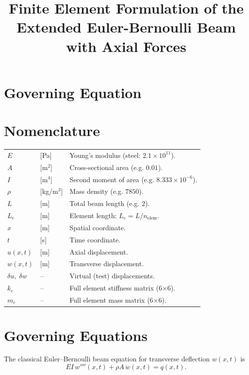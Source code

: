 \documentclass{article}
\begin{document}
	
	\title{Finite Element Formulation of the Extended Euler-Bernoulli Beam with Axial Forces}
	\author{}
	\date{}
	\maketitle
	
	\section*{Governing Equation}
	\section*{Nomenclature}
	\begin{tabular}{p{2cm} p{1cm} p{11cm}}
		$E$           & [Pa]    & Young’s modulus (steel: $2.1\times10^{11}$).\\
		$A$           & [m$^2$] & Cross‐sectional area (e.g. $0.01$).\\
		$I$           & [m$^4$] & Second moment of area (e.g. $8.333\times10^{-6}$).\\
		$\rho$        & [kg/m$^3$]& Mass density (e.g. $7850$).\\
		$L$           & [m]     & Total beam length (e.g. $2$).\\
		$L_e$         & [m]     & Element length: $L_e=L/n_{\mathrm{elem}}$.\\
		$x$           & [m]     & Spatial coordinate.\\
		$t$           & [s]     & Time coordinate.\\
		$u(x,t)$      & [m]     & Axial displacement.\\
		$w(x,t)$      & [m]     & Transverse displacement.\\
		$\delta u,\;\delta w$ & – & Virtual (test) displacements.\\
		$k_e$         & –       & Full element stiffness matrix (6×6).\\
		$m_e$         & –       & Full element mass matrix (6×6).\\
	\end{tabular}
	
	\section{Governing Equations}
	The classical Euler–Bernoulli beam equation for transverse deflection \(w(x,t)\) is
	\begin{equation}\label{eq:transverse_classical}
		EI\,w''''(x,t)
		+\rho A\,\ddot w(x,t)
		= q(x,t).
	\end{equation}
	
\end{document}

